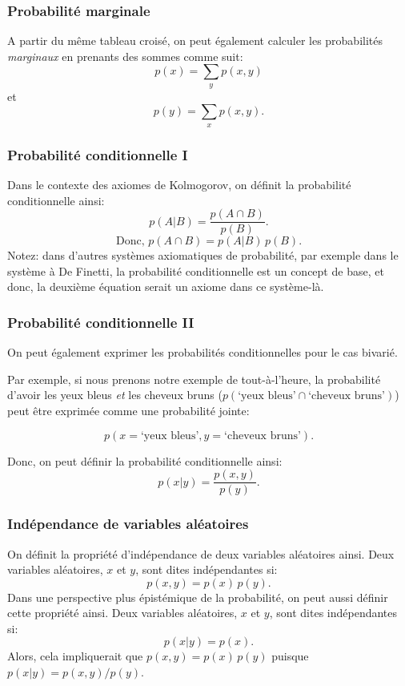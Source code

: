 \documentclass{beamer}
\begin{document}
\begin{frame}
    \frametitle{Probabilité marginale}
    A partir du même tableau croisé, on peut également calculer les probabilités \emph{marginaux} en prenants des sommes comme suit:
    \pause
    \[p(x) = \sum_y p(x,y)\]
    \pause
    et
    \[p(y) = \sum_x p(x,y).\]
\end{frame}


\begin{frame}
    \frametitle{Probabilité conditionnelle I}
    Dans le contexte des axiomes de Kolmogorov, on définit la probabilité conditionnelle ainsi:
    \[p(A | B) = \frac{p(A \cap B)}{p(B)}.\]
    \pause
    \[\textrm{Donc,} \, \, p(A \cap B) = p(A | B) \, p(B).\]
    \pause
    \vfill
    Notez: dans d'autres systèmes axiomatiques de probabilité, par exemple dans le système à De Finetti,
    la probabilité conditionnelle est un concept de base, et donc, la deuxième équation serait un axiome dans
    ce système-là.
\end{frame}


\begin{frame}
    \frametitle{Probabilité conditionnelle II}
    On peut également exprimer les probabilités conditionnelles pour le cas bivarié.

    \vfill

    \pause

    Par exemple, si nous prenons notre exemple de tout-à-l'heure, la probabilité d'avoir
    les yeux bleus \emph{et} les cheveux bruns ($p(\textrm{`yeux bleus'} \cap \textrm{`cheveux bruns'})$) peut
    être exprimée comme une probabilité jointe:
    
    \pause

    \[p(x=\textrm{`yeux bleus'}, y=\textrm{`cheveux bruns'}).\]

    \pause

    \vfill

    Donc, on peut définir la probabilité conditionnelle ainsi:
    \[p(x | y) = \frac{p(x,y)}{p(y)}.\]
\end{frame}


\begin{frame}
    \frametitle{Indépendance de variables aléatoires}
    On définit la propriété d'indépendance de deux variables aléatoires ainsi.
    Deux variables aléatoires, $x$ et $y$, sont dites indépendantes si:
    \[p(x,y) = p(x) \, p(y).\]
    \pause
    \vfill
    Dans une perspective plus épistémique de la probabilité, on peut aussi définir cette propriété ainsi.
    Deux variables aléatoires, $x$ et $y$, sont dites indépendantes si:
    \[p(x|y) = p(x).\]
    \pause
    \vfill
    Alors, cela impliquerait que $p(x,y) = p(x) \, p(y)$ puisque $p(x|y) = p(x,y) / p(y)$.
\end{frame}
\end{document}
